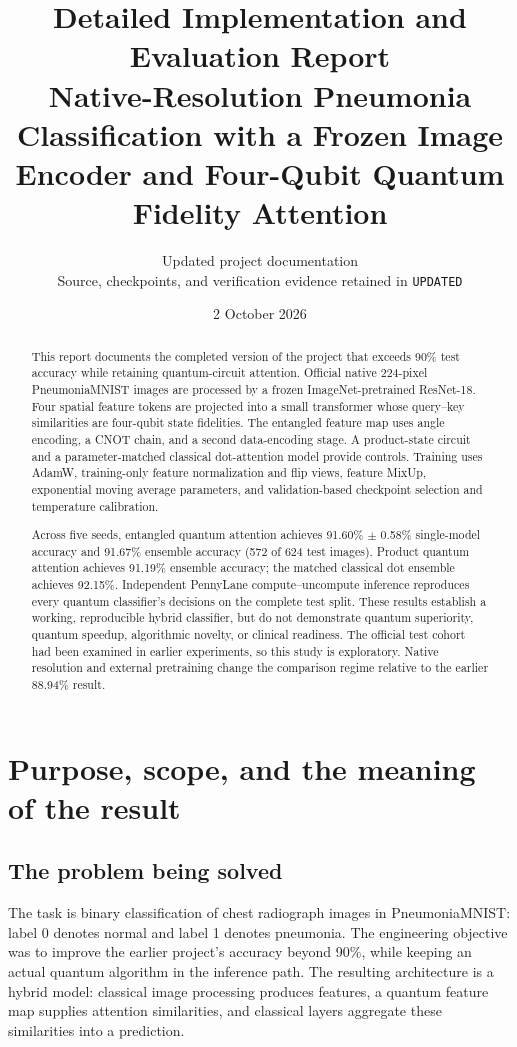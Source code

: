 \documentclass[11pt,a4paper]{report}
\title{Detailed Implementation and Evaluation Report\\[8mm]\large Native-Resolution Pneumonia Classification with a Frozen Image Encoder and Four-Qubit Quantum Fidelity Attention}
\author{Updated project documentation\\Source, checkpoints, and verification evidence retained in \texttt{UPDATED}}
\date{2 October 2026}
\begin{document}
\maketitle
\begin{abstract}
This report documents the completed version of the project that exceeds 90\% test accuracy while retaining quantum-circuit attention. Official native 224-pixel PneumoniaMNIST images are processed by a frozen ImageNet-pretrained ResNet-18. Four spatial feature tokens are projected into a small transformer whose query--key similarities are four-qubit state fidelities. The entangled feature map uses angle encoding, a CNOT chain, and a second data-encoding stage. A product-state circuit and a parameter-matched classical dot-attention model provide controls. Training uses AdamW, training-only feature normalization and flip views, feature MixUp, exponential moving average parameters, and validation-based checkpoint selection and temperature calibration.

Across five seeds, entangled quantum attention achieves 91.60\% $\pm$ 0.58\% single-model accuracy and 91.67\% ensemble accuracy (572 of 624 test images). Product quantum attention achieves 91.19\% ensemble accuracy; the matched classical dot ensemble achieves 92.15\%. Independent PennyLane compute--uncompute inference reproduces every quantum classifier's decisions on the complete test split. These results establish a working, reproducible hybrid classifier, but do not demonstrate quantum superiority, quantum speedup, algorithmic novelty, or clinical readiness. The official test cohort had been examined in earlier experiments, so this study is exploratory. Native resolution and external pretraining change the comparison regime relative to the earlier 88.94\% result.
\end{abstract}
\tableofcontents
\listoffigures
\listoftables

\chapter{Purpose, scope, and the meaning of the result}
\section{The problem being solved}
The task is binary classification of chest radiograph images in PneumoniaMNIST: label 0 denotes normal and label 1 denotes pneumonia. The engineering objective was to improve the earlier project's accuracy beyond 90\%, while keeping an actual quantum algorithm in the inference path. The resulting architecture is a hybrid model: classical image processing produces features, a quantum feature map supplies attention similarities, and classical layers aggregate these similarities into a prediction.
\end{document}
